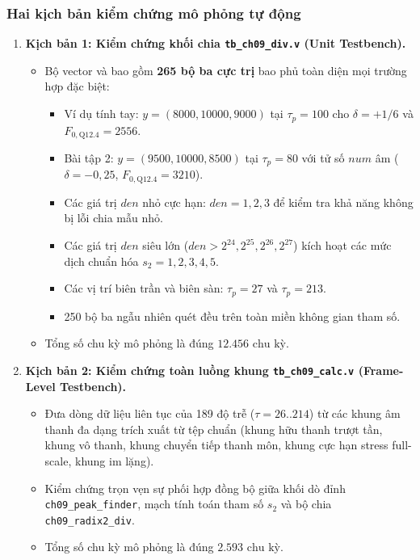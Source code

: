 \subsubsection*{Hai kịch bản kiểm chứng mô phỏng tự động}
\begin{enumerate}[leftmargin=1.5em, itemsep=4pt]
    \item \textbf{Kịch bản 1: Kiểm chứng khối chia \texttt{tb\_ch09\_div.v} (Unit Testbench).}
    \begin{itemize}[leftmargin=1.2em, itemsep=2pt]
        \item Bộ vector  và  bao gồm \textbf{265 bộ ba cực trị} bao phủ toàn diện mọi trường hợp đặc biệt:
        \begin{itemize}
            \item Ví dụ tính tay: $y = (8000, 10000, 9000)$ tại $\tau_p = 100$ cho $\delta = +1/6$ và $F_{0, \text{Q12.4}} = 2556$.
            \item Bài tập 2: $y = (9500, 10000, 8500)$ tại $\tau_p = 80$ với tử số $num$ âm ($\delta = -0{,}25$, $F_{0, \text{Q12.4}} = 3210$).
            \item Các giá trị $den$ nhỏ cực hạn: $den = 1, 2, 3$ để kiểm tra khả năng không bị lỗi chia mẫu nhỏ.
            \item Các giá trị $den$ siêu lớn ($den > 2^{24}, 2^{25}, 2^{26}, 2^{27}$) kích hoạt các mức dịch chuẩn hóa $s_2 = 1, 2, 3, 4, 5$.
            \item Các vị trí biên trần và biên sàn: $\tau_p = 27$ và $\tau_p = 213$.
            \item 250 bộ ba ngẫu nhiên quét đều trên toàn miền không gian tham số.
        \end{itemize}
        \item Tổng số chu kỳ mô phỏng là đúng \textbf{$12.456\text{ chu kỳ}$}.
    \end{itemize}

    \item \textbf{Kịch bản 2: Kiểm chứng toàn luồng khung \texttt{tb\_ch09\_calc.v} (Frame-Level Testbench).}
    \begin{itemize}[leftmargin=1.2em, itemsep=2pt]
        \item Đưa dòng dữ liệu liên tục của 189 độ trễ ($\tau = 26..214$) từ các khung âm thanh đa dạng trích xuất từ tệp chuẩn  (khung hữu thanh trượt tần, khung vô thanh, khung chuyển tiếp thanh môn, khung cực hạn stress full-scale, khung im lặng).
        \item Kiểm chứng trọn vẹn sự phối hợp đồng bộ giữa khối dò đỉnh \texttt{ch09\_peak\_finder}, mạch tính toán tham số $s_2$ và bộ chia \texttt{ch09\_radix2\_div}.
        \item Tổng số chu kỳ mô phỏng là đúng \textbf{$2.593\text{ chu kỳ}$}.
    \end{itemize}
\end{enumerate}


